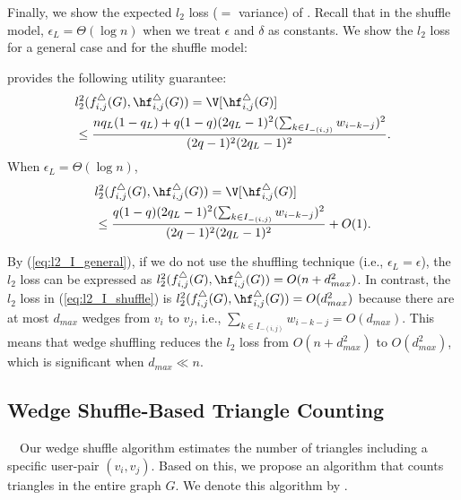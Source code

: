 Finally, we show the expected $l_2$ loss ($=$ variance) of \AlgWS{}. 
Recall that in the shuffle model, $\epsilon_L = \Theta(\log n)$ when we treat $\epsilon$ and $\delta$ as constants. 
We show 
the $l_2$ loss for a general case and for the shuffle model:
\begin{theorem}
\label{thm:l2-loss_I}
\AlgWS{} provides the following utility guarantee: 
\begin{align}
& l_2^2(f_{i,j}^\triangle(G), \hf_{i,j}^\triangle(G)) = \V[\hf_{i,j}^\triangle(G)] \nonumber\\ 
& \leq \frac{n q_L(1-q_L) + q(1-q)(2q_L-1)^2 (\sum_{k \in I_{-(i,j)}}w_{i-k-j})^2}{(2q-1)^2(2q_L-1)^2}.
\label{eq:l2_I_general}
\end{align}
When $\epsilon_L = \Theta(\log n)$, 
\begin{align}
& l_2^2(f_{i,j}^\triangle(G), \hf_{i,j}^\triangle(G)) = \V[\hf_{i,j}^\triangle(G)] \nonumber\\ 
& \leq \frac{q(1-q)(2q_L-1)^2 (\sum_{k \in I_{-(i,j)}}w_{i-k-j})^2}{(2q-1)^2(2q_L-1)^2} + O(1).
\label{eq:l2_I_shuffle}
\end{align}
\end{theorem}
By (\ref{eq:l2_I_general}), if we do not use the shuffling technique (i.e., $\epsilon_L = \epsilon$), the $l_2$ loss can be expressed as $l_2^2(f_{i,j}^\triangle(G), \hf_{i,j}^\triangle(G)) = O(n + d_{max}^2)$. 
In contrast, the $l_2$ loss in (\ref{eq:l2_I_shuffle}) is $l_2^2(f_{i,j}^\triangle(G), \hf_{i,j}^\triangle(G)) = O(d_{max}^2)$ because there are at most $d_{max}$ wedges from $v_i$ to $v_j$, i.e., $\sum_{k \in I_{-(i,j)}}w_{i-k-j} = O(d_{max})$. 
This means that wedge shuffling reduces the $l_2$ loss from $O(n + d_{max}^2)$ to $O(d_{max}^2)$, which is significant when $d_{max} \ll n$. 

\subsection{Wedge Shuffle-Based Triangle Counting}
\label{sub:triangle}
~~Our wedge shuffle algorithm \AlgWS{} estimates the number of triangles including a specific user-pair $(v_i,v_j)$. 
Based on this, we propose an algorithm that 
counts triangles in the entire graph $G$. 
We denote this algorithm by \AlgWSTri{}. 

